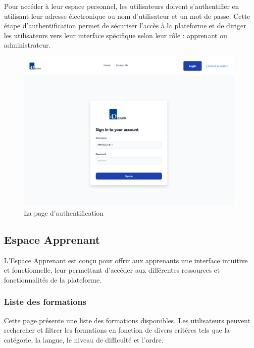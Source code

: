 Pour accéder à leur espace personnel, les utilisateurs doivent s'authentifier en utilisant leur adresse électronique ou nom d'utilisateur et un mot de passe. Cette étape d'authentification permet de sécuriser l'accès à la plateforme et de diriger les utilisateurs vers leur interface spécifique selon leur rôle : apprenant ou administrateur.


\begin{figure}[H]
    \centering
    \includegraphics[width=19cm]{Figures/authntification.png}
    \caption{La page d'authentification}
\end{figure}

\subsection{Espace Apprenant }

L'Espace Apprenant est conçu pour offrir aux apprenants une interface intuitive et fonctionnelle, leur permettant d'accéder aux différentes ressources et fonctionnalités de la plateforme.

\subsubsection{Liste des formations}

Cette page présente une liste des formations disponibles. Les utilisateurs peuvent rechercher et filtrer les formations en fonction de divers critères tels que la catégorie, la langue, le niveau de difficulté et l’ordre.


